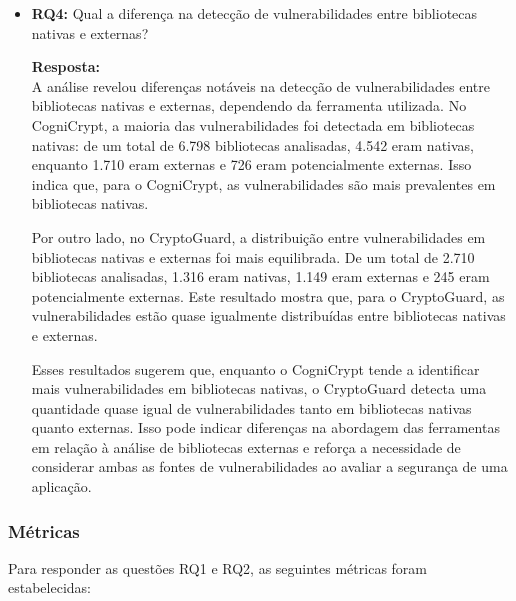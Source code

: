 \begin{itemize}
\item \textbf{RQ4:} Qual a diferença na detecção de vulnerabilidades entre bibliotecas nativas e externas?

\textbf{Resposta:} \\
A análise revelou diferenças notáveis na detecção de vulnerabilidades entre bibliotecas nativas e externas, dependendo da ferramenta utilizada. No CogniCrypt, a maioria das vulnerabilidades foi detectada em bibliotecas nativas: de um total de 6.798 bibliotecas analisadas, 4.542 eram nativas, enquanto 1.710 eram externas e 726 eram potencialmente externas. Isso indica que, para o CogniCrypt, as vulnerabilidades são mais prevalentes em bibliotecas nativas.

Por outro lado, no CryptoGuard, a distribuição entre vulnerabilidades em bibliotecas nativas e externas foi mais equilibrada. De um total de 2.710 bibliotecas analisadas, 1.316 eram nativas, 1.149 eram externas e 245 eram potencialmente externas. Este resultado mostra que, para o CryptoGuard, as vulnerabilidades estão quase igualmente distribuídas entre bibliotecas nativas e externas.

Esses resultados sugerem que, enquanto o CogniCrypt tende a identificar mais vulnerabilidades em bibliotecas nativas, o CryptoGuard detecta uma quantidade quase igual de vulnerabilidades tanto em bibliotecas nativas quanto externas. Isso pode indicar diferenças na abordagem das ferramentas em relação à análise de bibliotecas externas e reforça a necessidade de considerar ambas as fontes de vulnerabilidades ao avaliar a segurança de uma aplicação.
\end{itemize}

\subsubsection{Métricas}
Para responder as questões RQ1 e RQ2, as seguintes métricas foram estabelecidas:


